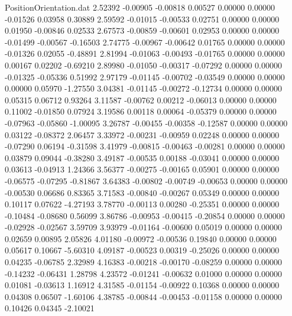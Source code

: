 \begin{filecontents}{PositionOrientation.dat}
   2.52392   -0.00905   -0.00818     0.00527    0.00000    0.00000   -0.01526    0.03958    0.30889
   2.59592   -0.01015   -0.00533     0.02751    0.00000    0.00000    0.01950   -0.00846    0.02533
   2.67573   -0.00859   -0.00601     0.02953    0.00000    0.00000   -0.01499   -0.00567   -0.16503
   2.74775   -0.00967   -0.00642     0.01765    0.00000    0.00000   -0.01326    0.02055   -0.48891
   2.81994   -0.01063   -0.00493    -0.01765    0.00000    0.00000    0.00167    0.02202   -0.69210
   2.89980   -0.01050   -0.00317    -0.07292    0.00000    0.00000   -0.01325   -0.05336    0.51992
   2.97179   -0.01145   -0.00702    -0.03549    0.00000    0.00000    0.00000    0.05970   -1.27550
   3.04381   -0.01145   -0.00272    -0.12734    0.00000    0.00000    0.05315    0.06712    0.93264
   3.11587   -0.00762    0.00212    -0.06013    0.00000    0.00000    0.11002   -0.01850    0.07924
   3.19586    0.00118    0.00064    -0.05379    0.00000    0.00000   -0.07963   -0.05860   -1.00095
   3.26787   -0.00455   -0.00358    -0.12587    0.00000    0.00000    0.03122   -0.08372    2.06457
   3.33972   -0.00231   -0.00959     0.02248    0.00000    0.00000   -0.07290    0.06194   -0.31598
   3.41979   -0.00815   -0.00463    -0.00281    0.00000    0.00000    0.03879    0.09044   -0.38280
   3.49187   -0.00535    0.00188    -0.03041    0.00000    0.00000    0.03613   -0.04913    1.24366
   3.56377   -0.00275   -0.00165     0.05901    0.00000    0.00000   -0.06575   -0.07295   -0.81867
   3.64383   -0.00802   -0.00749    -0.00653    0.00000    0.00000   -0.00530    0.06686    0.83365
   3.71583   -0.00840   -0.00267     0.05349    0.00000    0.00000    0.10117    0.07622   -4.27193
   3.78770   -0.00113    0.00280    -0.25351    0.00000    0.00000   -0.10484   -0.08680    0.56099
   3.86786   -0.00953   -0.00415    -0.20854    0.00000    0.00000   -0.02928   -0.02567    3.59709
   3.93979   -0.01164   -0.00600     0.05019    0.00000    0.00000    0.02659    0.00895    2.05826
   4.01180   -0.00972   -0.00536     0.19840    0.00000    0.00000    0.05617    0.10667   -5.60310
   4.09187   -0.00523    0.00319    -0.25026    0.00000    0.00000    0.04235   -0.06785    2.32989
   4.16383   -0.00218   -0.00170    -0.08259    0.00000    0.00000   -0.14232   -0.06431    1.28798
   4.23572   -0.01241   -0.00632     0.01000    0.00000    0.00000    0.01081   -0.03613    1.16912
   4.31585   -0.01154   -0.00922     0.10368    0.00000    0.00000    0.04308    0.06507   -1.60106
   4.38785   -0.00844   -0.00453    -0.01158    0.00000    0.00000    0.10426    0.04345   -2.10021

\end{filecontents}
